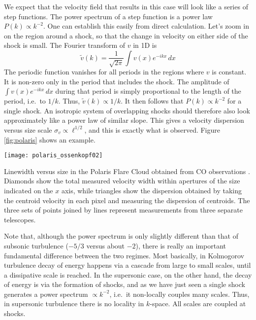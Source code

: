 We expect that the velocity field that results in this case will look like a series of step functions. The power spectrum of a step function is a power law $P(k)\propto k^{-2}$. One can establish this easily from direct calculation. Let's zoom in on the region around a shock, so that the change in velocity on either side of the shock is small. The Fourier transform of $v$ in 1D is
\begin{equation}
\tilde{v}(k) = \frac{1}{\sqrt{2\pi}} \int v(x) e^{-i kx}\, dx
\end{equation}
The periodic function vanishes for all periods in the regions where $v$ is constant. It is non-zero only in the period that includes the shock. The amplitude of $\int v(x) e^{-i kx}\, dx$ during that period is simply proportional to the length of the period, i.e.\ to $1/k$. Thus, $\tilde{v}(k)\propto 1/k$. It then follows that $P(k)\propto k^{-2}$ for a single shock. An isotropic system of overlapping shocks should therefore also look approximately like a power law of similar slope. This gives a velocity dispersion versus size scale $\sigma_v\propto \ell^{1/2}$, and this is exactly what is observed. Figure \ref{fig:polaris} shows an example.

\begin{marginfigure}
\texttt{[image: polaris\_ossenkopf02]}
\caption[Linewidth versus Size in the Polaris Flare Cloud]{
\label{fig:polaris}
Linewidth versus size in the Polaris Flare Cloud obtained from CO observations \citep{ossenkopf02a}. Diamonds show the total measured velocity width within apertures of the size indicated on the $x$ axis, while triangles show the dispersion obtained by taking the centroid velocity in each pixel and measuring the dispersion of centroids. The three sets of points joined by lines represent measurements from three separate telescopes.
}
\end{marginfigure}

Note that, although the power spectrum is only slightly different than that of subsonic turbulence ($-5/3$ versus about $-2$), there is really an important fundamental difference between the two regimes. Most basically, in Kolmogorov turbulence decay of energy happens via a cascade from large to small scales, until a dissipative scale is reached. In the supersonic case, on the other hand, the decay of energy is via the formation of shocks, and as we have just seen a single shock generates a power spectrum $\propto k^{-2}$, i.e.\ it non-locally couples many scales. Thus, in supersonic turbulence there is no locality in $k$-space. All scales are coupled at shocks.

